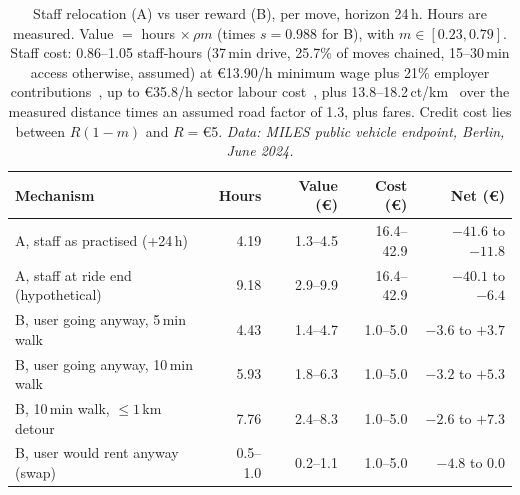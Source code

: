 \documentclass[11pt,a4paper]{article}
\newcommand{\eur}[1]{\euro{}#1}
\begin{document}
\begin{table}[h]
\centering\small
\caption{Staff relocation (A) vs user reward (B), per move, horizon 24\,h. Hours are measured. Value $=$ hours $\times\,\rho m$ (times $s=0.988$ for B), with $m\in[0.23,0.79]$. Staff cost: 0.86--1.05 staff-hours (37\,min drive, 25.7\% of moves chained, 15--30\,min access otherwise, assumed) at \eur{13.90}/h minimum wage plus 21\% employer contributions~\citep{mindestlohn2026}, up to \eur{35.8}/h sector labour cost~\citep{destatis2026labour}, plus 13.8--18.2\,ct/km~\citep{adacpolo2026} over the measured distance times an assumed road factor of 1.3, plus fares. Credit cost lies between $R(1-m)$ and $R={}$\eur{5}. \emph{Data: MILES public vehicle endpoint, Berlin, June 2024.}}
\label{tab:ab}
\begin{tabular}{@{}lrrrr@{}}
\toprule
Mechanism & Hours & Value (\euro) & Cost (\euro) & Net (\euro) \\
\midrule
A, staff as practised (+24\,h) & 4.19 & 1.3--4.5 & 16.4--42.9 & $-41.6$ to $-11.8$ \\
A, staff at ride end (hypothetical) & 9.18 & 2.9--9.9 & 16.4--42.9 & $-40.1$ to $-6.4$ \\
B, user going anyway, 5\,min walk & 4.43 & 1.4--4.7 & 1.0--5.0 & $-3.6$ to $+3.7$ \\
B, user going anyway, 10\,min walk & 5.93 & 1.8--6.3 & 1.0--5.0 & $-3.2$ to $+5.3$ \\
B, 10\,min walk, ${\le}1$\,km detour & 7.76 & 2.4--8.3 & 1.0--5.0 & $-2.6$ to $+7.3$ \\
B, user would rent anyway (swap) & 0.5--1.0 & 0.2--1.1 & 1.0--5.0 & $-4.8$ to $0.0$ \\
\bottomrule
\end{tabular}
\end{table}
\end{document}

